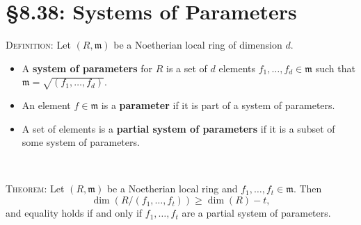 \documentclass[12pt]{amsart}
\newcommand{\m}{\mathfrak{m}}
\renewcommand{\1}{\mathbbm{1}}
\newcommand{\showsol}[1]{\def\displaysol{#1}}
\begin{document}
\showsol{1}
	
	\thispagestyle{empty}
	
	\section*{\S8.38: Systems of Parameters}
	
	\begin{framed}
	
	\noindent	\textsc{Definition:} Let $(R,\m)$ be a Noetherian local ring of dimension $d$. 
	\begin{itemize}
	\item A \textbf{system of parameters} for $R$ is a set of $d$ elements $f_1,\dots,f_d\in \m$ such that ${\m=\sqrt{(f_1,\dots,f_d)}}$. 
	\item An element $f\in \m$ is a \textbf{parameter} if it is part of a system of parameters.
	\item A set of elements is a \textbf{partial system of parameters} if it is a subset of some system of parameters.
	\end{itemize}
	
	\
	
	\noindent \textsc{Theorem:} Let $(R,\m)$ be a Noetherian local ring and $f_1,\dots,f_t\in \m$. Then
	\[ \dim(R/ (f_1,\dots,f_t)) \geq \dim(R) - t,\]
	and equality holds if and only if $f_1,\dots,f_t$ are a partial system of parameters.
	
	
		\end{framed}
\end{document}
